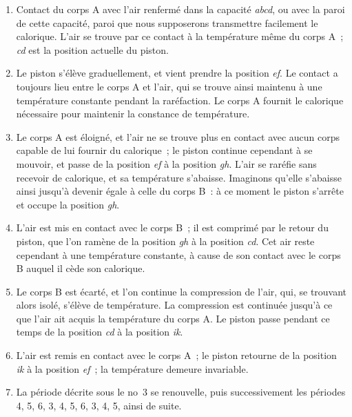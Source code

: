 \documentclass[french,twoside]{book} %
\begin{document}
\begin{enumerate}[itemsep=0pt,topsep=0pt,partopsep=0pt,parskip=0pt]
\item Contact du corps A avec l’air renfermé dans la capacité \emph{abcd}, ou avec la paroi de cette capacité, paroi que nous supposerons transmettre facilement le calorique. L’air se trouve par ce contact à la température même du corps A ; \emph{cd} est la position actuelle du piston.
\item Le piston s’élève graduellement, et vient prendre la position \emph{ef}. Le contact a toujours lieu entre le corps A et l’air, qui se trouve ainsi maintenu à une température constante pendant la raréfaction. Le corps A fournit le calorique nécessaire pour maintenir la constance de température.
\item Le corps A est éloigné, et l’air ne se trouve plus en contact avec aucun corps capable de lui fournir du calorique ; le piston continue cependant à se mouvoir, et passe de la position \emph{ef} à la position \emph{gh}. L’air se raréfie sans recevoir de calorique, et sa température s’abaisse. Imaginons qu’elle s’abaisse ainsi jusqu’à devenir égale à celle du corps B : à ce moment le piston s’arrête et occupe la position \emph{gh}.
\item L’air est mis en contact avec le corps B ; il est comprimé par le retour du piston, que l’on ramène de la position \emph{gh} à la position \emph{cd}. Cet air reste cependant à une température constante, à cause de son contact avec le corps B auquel il cède son calorique.
\item Le corps B est écarté, et l’on continue la compression de l’air, qui, se trouvant alors isolé, s’élève de température. La compression est continuée jusqu’à ce que l’air ait acquis la température du corps A. Le piston passe pendant ce temps de la position \emph{cd} à la position \emph{ik}.
\item L’air est remis en contact avec le corps A ; le piston retourne de la position \emph{ik} à la position \emph{ef} ; la température demeure invariable.
\item La période décrite sous le no 3 se renouvelle, puis successivement les périodes 4, 5, 6, 3, 4, 5, 6, 3, 4, 5, ainsi de suite.
\end{enumerate}
\end{document}
